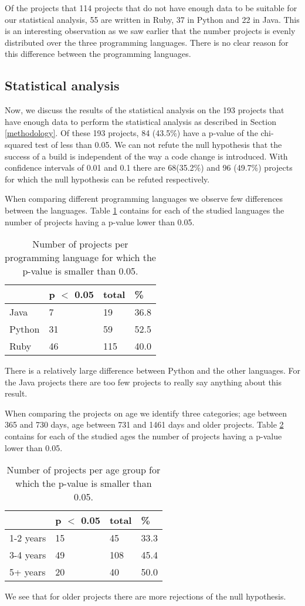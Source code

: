 Of the projects that 114 projects that do not have enough data to be suitable for our statistical analysis, 55 are written in Ruby, 37 in Python and 22 in Java.
This is an interesting observation as we saw earlier that the number projects is evenly distributed over the three programming languages.
There is no clear reason for this difference between the programming languages.

\subsection{Statistical analysis}
Now, we discuss the results of the statistical analysis on the 193 projects that have enough data to perform the statistical analysis as described in Section \ref{methodology}.
Of these 193 projects, 84 (43.5\%) have a p-value of the chi-squared test of less than 0.05. 
We can not refute the null hypothesis that the success of a build is independent of the way a code change is introduced.
With confidence intervals of 0.01 and 0.1 there are 68(35.2\%) and 96 (49.7\%) projects for which the null hypothesis can be refuted respectively.

When comparing different programming languages we observe few differences between the languages.
Table \ref{tab:p-for-lang} contains for each of the studied languages the number of projects having a p-value lower than 0.05.
\begin{table}[h]
\begin{tabular}{ l | l l l}
 & p $<$ 0.05 & total & \%\\
\hline
Java & 7 & 19 & 36.8\\
Python & 31 & 59 & 52.5 \\
Ruby & 46 & 115 & 40.0
\end{tabular}
\caption{Number of projects per programming language for which the p-value is smaller than 0.05.}
\label{tab:p-for-lang}
\end{table}
There is a relatively large difference between Python and the other languages. 
For the Java projects there are too few projects to really say anything about this result.

When comparing the projects on age we identify three categories; age between 365 and 730 days, age between 731 and 1461 days and older projects.
Table \ref{tab:p-for-age} contains for each of the studied ages the number of projects having a p-value lower than 0.05.
\begin{table}[h]
\begin{tabular}{ l | l l l}
 & p $<$ 0.05 & total & \%\\
\hline
1-2 years & 15 & 45 & 33.3\\
3-4 years & 49 & 108 & 45.4 \\
5+ years & 20 & 40 & 50.0
\end{tabular}
\caption{Number of projects per age group for which the p-value is smaller than 0.05.}
\label{tab:p-for-age}
\end{table}
We see that for older projects there are more rejections of the null hypothesis. 

